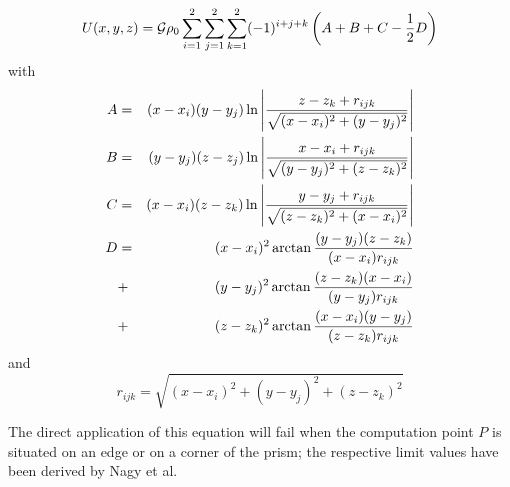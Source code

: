 \[
U(x,y,z)= {\cal G} \rho_0
\sum_{i=1}^2\sum_{j=1}^2\sum_{k=1}^2 (-1)^{i+j+k}
\left(A+B+C-\frac{1}{2}D\right)
\]
with 
\begin{eqnarray}
A&=& (x-x_i)(y-y_j) \ln \left|  \frac{z-z_k + r_{ijk}}{\sqrt{(x-x_i)^2+(y-y_j)^2}}   \right| \nonumber\\
B&=& (y-y_j)(z-z_j) \ln \left|  \frac{x-x_i + r_{ijk}}{\sqrt{(y-y_j)^2+(z-z_k)^2}}   \right| \nonumber\\
C&=& (x-x_i)(z-z_k) \ln \left|  \frac{y-y_j + r_{ijk}}{\sqrt{(z-z_k)^2+(x-x_i)^2}}   \right| \nonumber\\
D&=& (x-x_i)^2 \arctan \frac{(y-y_j) (z-z_k)}{(x-x_i) r_{ijk}} \nonumber\\
 &+& (y-y_j)^2 \arctan \frac{(z-z_k) (x-x_i)}{(y-y_j) r_{ijk}} \nonumber\\
 &+& (z-z_k)^2 \arctan \frac{(x-x_i) (y-y_j)}{(z-z_k) r_{ijk}} \nonumber 
\end{eqnarray}
and 
\[
r_{ijk}=\sqrt{ (x-x_i)^2+(y-y_j)^2+(z-z_k)^2}
\]
\begin{remark}
The direct application of this equation will fail when the computation point $P$ is situated on an edge or on
a corner of the prism; the respective limit values have been derived by Nagy et al. \cite{napb00,napb02}
\end{remark}


